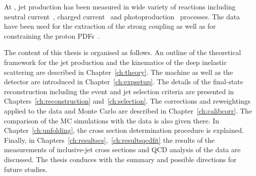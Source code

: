 At \hera, jet production has been measured in wide variety of reactions including neutral current~\cite{epj:c19:289,pl:b547:164,pl:b551:226,np:b765:1,pl:b649:12,epj:c65:363,epj:c67:1,pl:b507:70,epj:c23:13,pl:b515:17,epj:c44:183,pr:d85:052008}, charged current~\cite{epj:c31:149,pr:d78:032004} and photoproduction~\cite{pl:b560:7,epj:c29:497,epj:c11:35,epj:c23:615,pl:b531:9,epj:c25:13,pl:b639:21,pr:d76:072011,pl:b443:394,np:b792:1} processes. The data have been used for the extraction of the strong coupling as well as for constraining the proton PDFs~\cite{epj:c42:1}.

The content of this thesis is organised as follows. An outline of the theoretical framework for the jet production and the kinematics of the deep inelastic scattering are described in Chapter~\ref{ch:theory}. The \hera machine as well as the \zeus detector are introduced in Chapter~\ref{ch:expsetup}. The details of the final-state reconstruction including the event and jet selection criteria are presented in Chapters~\ref{ch:reconstruction} and~\ref{ch:selection}. The corrections and reweightings applied to the data and Monte Carlo are described in Chapter~\ref{ch:calibcorr}. The comparison of the MC simulations with the data is also given there. In Chapter~\ref{ch:unfolding}, the cross section determination procedure is explained. Finally, in Chapters~\ref{ch:resultscs},~\ref{ch:resultsqcdfit} the results of the measurements of inclusive-jet cross sections and QCD analysis of the data are discussed. The thesis conduces with the summary and possible directions for future studies.